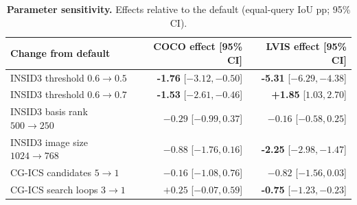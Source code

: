 \begin{table}[t]
    \centering
    \small
    \caption{\textbf{Parameter sensitivity.} Effects relative to the default (equal-query IoU pp; 95\% CI).}
    \label{tab:sweeps}
    \begin{tabularx}{\textwidth}{@{}Xrr@{}}
        \toprule
        \rowcolor{ReportBlue!12}
        Change from default & COCO effect [95\% CI] & LVIS effect [95\% CI] \\
        \midrule
        INSID3 threshold $0.6\rightarrow0.5$ & \textcolor{ReportCoral!70!black}{\textbf{-1.76}} [$-3.12,-0.50$] & \textcolor{ReportCoral!70!black}{\textbf{-5.31}} [$-6.29,-4.38$] \\
        INSID3 threshold $0.6\rightarrow0.7$ & \textcolor{ReportCoral!70!black}{\textbf{-1.53}} [$-2.61,-0.46$] & \textcolor{ReportBlue}{\textbf{+1.85}} [$1.03,2.70$] \\
        INSID3 basis rank $500\rightarrow250$ & $-0.29$ [$-0.99,0.37$] & $-0.16$ [$-0.58,0.25$] \\
        INSID3 image size $1024\rightarrow768$ & $-0.88$ [$-1.76,0.16$] & \textcolor{ReportCoral!70!black}{\textbf{-2.25}} [$-2.98,-1.47$] \\
        CG-ICS candidates $5\rightarrow1$ & $-0.16$ [$-1.08,0.76$] & $-0.82$ [$-1.56,0.03$] \\
        CG-ICS search loops $3\rightarrow1$ & $+0.25$ [$-0.07,0.59$] & \textcolor{ReportCoral!70!black}{\textbf{-0.75}} [$-1.23,-0.23$] \\
        \bottomrule
    \end{tabularx}
\end{table}

